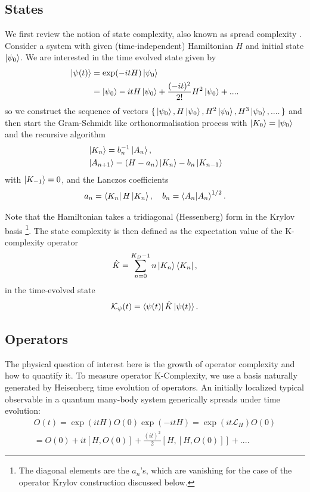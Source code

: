 \documentclass[a4paper,12pt]{article}
\begin{document}
\subsection{States}
We first review the notion of state complexity, also known as spread complexity \cite{Balasubramanian_2022}.  Consider a system with given (time-independent) Hamiltonian $H$ and initial state $\ket{\psi_0}$. We are interested in the time evolved state given by
\begin{align}
    \ket{\psi(t)}&= \exp (-itH) \ket{\psi_0}\nonumber \\ &=\ket{\psi_0}-itH \ket{\psi_0}+\frac{(-it)^ 2}{2!} H^ 2\ket{\psi_0}+....
\end{align}
so we construct the sequence of vectors $\{ \,\ket{\psi_0}, H \ket{\psi_0}, H^ 2 \ket{\psi_0}, H^ 3 \ket{\psi_0},....\,\}$ and then start the Gram-Schmidt like orthonormalisation process with $\ket{K_0}=\ket{\psi_0}$ and the recursive algorithm    
\begin{align}
    &\ket{K_n}=b_n^{-1} \ket{A_n},\nonumber \\ &\ket{A_{n+1}}=(H-a_n)\ket{K_n}-b_n \ket{K_{n-1}}
\end{align}
with $\ket{K_{-1}}=0$, and the Lanczos coefficients
\begin{align}
    a_n=\bra{K_n}{H}\ket{K_n}, \,\,\,\,\,\,b_n=\braket{A_n}^{1/2}.
\end{align}

Note that the Hamiltonian takes a tridiagonal (Hessenberg) form in the Krylov basis \footnote{The diagonal elements are the $a_n$'s, which are vanishing for the case of the operator Krylov construction discussed below.}. The state complexity is then defined as the expectation value of the K-complexity operator 
\begin{align} \label{KO}
\hat{K}=\sum_{n=0}^{K_D-1} n\ket{K_n}\bra{K_n},
\end{align}
in the time-evolved state
\begin{align}    
\mathcal{K}_{\psi}(t)= \bra{\psi(t)}\hat{K}\ket{\psi(t)}.
\end{align}

\subsection{Operators}
 The physical question of interest here is the growth of operator complexity and how to quantify it. To measure operator K-Complexity, we use a basis naturally generated by Heisenberg time evolution of operators.  
 An initially localized typical observable in a quantum many-body system generically spreads under time evolution:
\begin{align}   
O(t)=\exp (itH)O(0)\exp (-itH)= \exp(it \mathcal{L}_H) O(0) \nonumber\\
= O(0)+it [H,O(0)]+ \frac{(it)^ 2}{2}[H,[H,O(0)]]+.... \nonumber
\end{align}  
\end{document}
